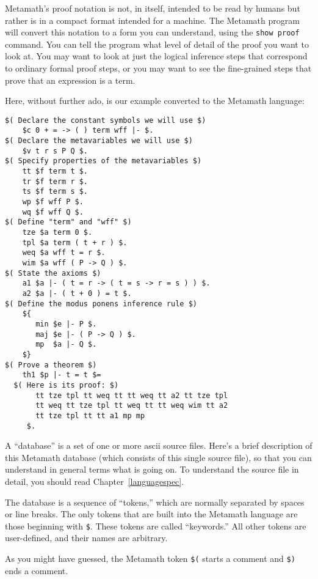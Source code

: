 Metamath's proof notation is not, in itself, intended to be read by humans but
rather is in a compact format intended for a machine.  The Metamath program
will convert this notation to a form you can understand, using the \texttt{show
proof} command.  You can tell the program what
level of detail of the proof you want to look at.  You may want to look at
just the logical inference steps that correspond
to ordinary formal proof steps,
or you may want to see the fine-grained steps that prove that an expression is
a term.

Here, without further ado, is our example converted to the
Metamath language:\label{demo0}

\begin{verbatim}
$( Declare the constant symbols we will use $)
    $c 0 + = -> ( ) term wff |- $.
$( Declare the metavariables we will use $)
    $v t r s P Q $.
$( Specify properties of the metavariables $)
    tt $f term t $.
    tr $f term r $.
    ts $f term s $.
    wp $f wff P $.
    wq $f wff Q $.
$( Define "term" and "wff" $)
    tze $a term 0 $.
    tpl $a term ( t + r ) $.
    weq $a wff t = r $.
    wim $a wff ( P -> Q ) $.
$( State the axioms $)
    a1 $a |- ( t = r -> ( t = s -> r = s ) ) $.
    a2 $a |- ( t + 0 ) = t $.
$( Define the modus ponens inference rule $)
    ${
       min $e |- P $.
       maj $e |- ( P -> Q ) $.
       mp  $a |- Q $.
    $}
$( Prove a theorem $)
    th1 $p |- t = t $=
  $( Here is its proof: $)
       tt tze tpl tt weq tt tt weq tt a2 tt tze tpl
       tt weq tt tze tpl tt weq tt tt weq wim tt a2
       tt tze tpl tt tt a1 mp mp
     $.
\end{verbatim}

A ``database'' is a set of one or more {\sc ascii} source
files.  Here's a brief description of this Metamath database
(which consists of this single source file), so that you can understand in
general terms what is going on.  To understand the source file in detail, you
should read Chapter~\ref{languagespec}.

The database is a sequence of ``tokens,'' which are normally
separated by spaces or line breaks.  The only tokens that are built into
the Metamath language are those beginning with \texttt{\$}.  These tokens
are called ``keywords.''  All other tokens are
user-defined, and their names are arbitrary.

As you might have guessed, the Metamath token \texttt{\$(} starts a comment and \texttt{\$)} ends a comment.

